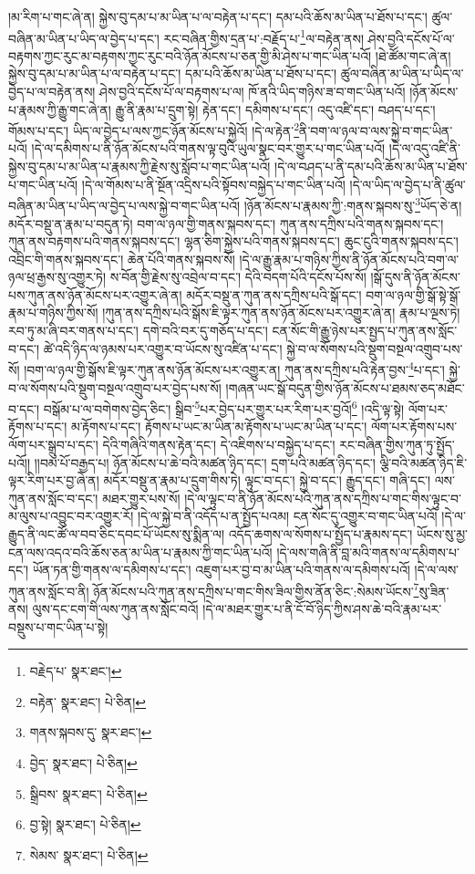 །མ་རིག་པ་གང་ཞེ་ན། སྐྱེས་བུ་དམ་པ་མ་ཡིན་པ་ལ་བརྟེན་པ་དང་། དམ་པའི་ཆོས་མ་ཡིན་པ་ཐོས་པ་དང་། ཚུལ་བཞིན་མ་ཡིན་པ་ཡིད་ལ་བྱེད་པ་དང་། རང་བཞིན་གྱིས་དྲན་པ་:བརྗོད་པ་\footnote{བརྗེད་པ་  སྣར་ཐང་། }ལ་བརྟེན་ནས། ཤེས་བྱའི་དངོས་པོ་ལ་བརྟགས་ཀྱང་རུང་མ་བརྟགས་ཀྱང་རུང་བའི་ཉོན་མོངས་པ་ཅན་གྱི་མི་ཤེས་པ་གང་ཡིན་པའོ། །ཐེ་ཚོམ་གང་ཞེ་ན། སྐྱེས་བུ་དམ་པ་མ་ཡིན་པ་ལ་བརྟེན་པ་དང་། དམ་པའི་ཆོས་མ་ཡིན་པ་ཐོས་པ་དང་། ཚུལ་བཞིན་མ་ཡིན་པ་ཡིད་ལ་བྱེད་པ་ལ་བརྟེན་ནས། ཤེས་བྱའི་དངོས་པོ་ལ་བརྟགས་པ་ལ། ཁོ་ནའི་ཡིད་གཉིས་ཟ་བ་གང་ཡིན་པའོ། །ཉོན་མོངས་པ་རྣམས་ཀྱི་རྒྱུ་གང་ཞེ་ན། རྒྱུ་ནི་རྣམ་པ་དྲུག་སྟེ། རྟེན་དང་། དམིགས་པ་དང་། འདུ་འཛི་དང་། བཤད་པ་དང་། གོམས་པ་དང་། ཡིད་ལ་བྱེད་པ་ལས་ཀྱང་ཉོན་མོངས་པ་སྐྱེའོ། །དེ་ལ་རྟེན་\footnote{བརྟེན་  སྣར་ཐང་།  པེ་ཅིན། }ནི་བག་ལ་ཉལ་བ་ལས་སྐྱེ་བ་གང་ཡིན་པའོ། །དེ་ལ་དམིགས་པ་ནི་ཉོན་མོངས་པའི་གནས་ལྟ་བུའི་ཡུལ་སྣང་བར་གྱུར་པ་གང་ཡིན་པའོ། །དེ་ལ་འདུ་འཛི་ནི་སྐྱེས་བུ་དམ་པ་མ་ཡིན་པ་རྣམས་ཀྱི་རྗེས་སུ་སློབ་པ་གང་ཡིན་པའོ། །དེ་ལ་བཤད་པ་ནི་དམ་པའི་ཆོས་མ་ཡིན་པ་ཐོས་པ་གང་ཡིན་པའོ། །དེ་ལ་གོམས་པ་ནི་སྔོན་འདྲིས་པའི་སྟོབས་བསྐྱེད་པ་གང་ཡིན་པའོ། །དེ་ལ་ཡིད་ལ་བྱེད་པ་ནི་ཚུལ་བཞིན་མ་ཡིན་པ་ཡིད་ལ་བྱེད་པ་ལས་སྐྱེ་བ་གང་ཡིན་པའོ། །ཉོན་མོངས་པ་རྣམས་ཀྱི་:གནས་སྐབས་སུ་\footnote{གནས་སྐབས་དུ་  སྣར་ཐང་། }ཡོད་ཅེ་ན། མདོར་བསྡུ་ན་རྣམ་པ་བདུན་ཏེ། བག་ལ་ཉལ་གྱི་གནས་སྐབས་དང་། ཀུན་ནས་དཀྲིས་པའི་གནས་སྐབས་དང་། ཀུན་ནས་བརྟགས་པའི་གནས་སྐབས་དང་། ལྷན་ཅིག་སྐྱེས་པའི་གནས་སྐབས་དང་། ཆུང་ངུའི་གནས་སྐབས་དང་། འབྲིང་གི་གནས་སྐབས་དང་། ཆེན་པོའི་གནས་སྐབས་སོ། །དེ་ལ་རྒྱུ་རྣམ་པ་གཉིས་ཀྱིས་ནི་ཉོན་མོངས་པའི་བག་ལ་ཉལ་ཕྲ་རྒྱས་སུ་འགྱུར་ཏེ། ས་བོན་གྱི་རྗེས་སུ་འབྲེལ་བ་དང་། དེའི་བདག་པོའི་དངོས་པོས་སོ། །སྒོ་དུས་ནི་ཉོན་མོངས་པས་ཀུན་ནས་ཉོན་མོངས་པར་འགྱུར་ཞེ་ན། མདོར་བསྡུ་ན་ཀུན་ནས་དཀྲིས་པའི་སྒོ་དང་། བག་ལ་ཉལ་གྱི་སྒོ་སྟེ་སྒོ་རྣམ་པ་གཉིས་ཀྱིས་སོ། །ཀུན་ནས་དཀྲིས་པའི་སྒོས་ཇི་ལྟར་ཀུན་ནས་ཉོན་མོངས་པར་འགྱུར་ཞེ་ན། རྣམ་པ་ལྔས་ཏེ། རབ་ཏུ་མ་ཞི་བར་གནས་པ་དང་། དགེ་བའི་བར་དུ་གཅོད་པ་དང་། ངན་སོང་གི་རྒྱུ་ཉེས་པར་སྤྱད་པ་ཀུན་ནས་སློང་བ་དང་། ཚེ་འདི་ཉིད་ལ་ཉམས་པར་འགྱུར་བ་ཡོངས་སུ་འཛིན་པ་དང་། སྐྱེ་བ་ལ་སོགས་པའི་སྡུག་བསྔལ་འགྲུབ་པས་སོ། །བག་ལ་ཉལ་གྱི་སྒོས་ཇི་ལྟར་ཀུན་ནས་ཉོན་མོངས་པར་འགྱུར་ན། ཀུན་ནས་དཀྲིས་པའི་རྟེན་བྱས་\footnote{བྱེད་  སྣར་ཐང་།  པེ་ཅིན། }པ་དང་། སྐྱེ་བ་ལ་སོགས་པའི་སྡུག་བསྔལ་འགྲུབ་པར་བྱེད་པས་སོ། །གཞན་ཡང་སྒོ་བདུན་གྱིས་ཉོན་མོངས་པ་ཐམས་ཅད་མཐོང་བ་དང་། བསྒོམ་པ་ལ་བགེགས་བྱེད་ཅིང་། སྒྲིབ་\footnote{སྒྲིབས་  སྣར་ཐང་།  པེ་ཅིན། }པར་བྱེད་པར་གྱུར་པར་རིག་པར་བྱའོ།\footnote{བྱ་སྟེ།  སྣར་ཐང་།  པེ་ཅིན། } །འདི་ལྟ་སྟེ། ལོག་པར་རྟོགས་པ་དང་། མ་རྟོགས་པ་དང་། རྟོགས་པ་ཡང་མ་ཡིན་མ་རྟོགས་པ་ཡང་མ་ཡིན་པ་དང་། ལོག་པར་རྟོགས་པས་ལོག་པར་སྒྲུབ་པ་དང་། དེའི་གཞིའི་གནས་རྟེན་དང་། དེ་འཇིགས་པ་བསྐྱེད་པ་དང་། རང་བཞིན་གྱིས་ཀུན་ཏུ་སྤྱོད་པའོ།། །།བམ་པོ་བརྒྱད་པ། ཉོན་མོངས་པ་ཆེ་བའི་མཚན་ཉིད་དང་། དྲག་པའི་མཚན་ཉིད་དང་། ལྕི་བའི་མཚན་ཉིད་ཇི་ལྟར་རིག་པར་བྱ་ཞེ་ན། མདོར་བསྡུ་ན་རྣམ་པ་དྲུག་གིས་ཏེ། ལྟུང་བ་དང་། སྐྱེ་བ་དང་། རྒྱུད་དང་། གཞི་དང་། ལས་ཀུན་ནས་སློང་བ་དང་། མཐར་གྱུར་པས་སོ། །དེ་ལ་ལྟུང་བ་ནི་ཉོན་མོངས་པའི་ཀུན་ནས་དཀྲིས་པ་གང་གིས་ལྟུང་བ་མ་ལུས་པ་འབྱུང་བར་འགྱུར་རོ། །དེ་ལ་སྐྱེ་བ་ནི་འདོད་པ་ན་སྤྱོད་པའམ། ངན་སོང་དུ་འགྱུར་བ་གང་ཡིན་པའོ། །དེ་ལ་རྒྱུད་ནི་ལང་ཚོ་ལ་བབ་ཅིང་དབང་པོ་ཡོངས་སུ་སྨིན་ལ། འདོད་ཆགས་ལ་སོགས་པ་སྤྱོད་པ་རྣམས་དང་། ཡོངས་སུ་མྱ་ངན་ལས་འདའ་བའི་ཆོས་ཅན་མ་ཡིན་པ་རྣམས་ཀྱི་གང་ཡིན་པའོ། །དེ་ལས་གཞི་ནི་བླ་མའི་གནས་ལ་དམིགས་པ་དང་། ཡོན་ཏན་གྱི་གནས་ལ་དམིགས་པ་དང་། འཇུག་པར་བྱ་བ་མ་ཡིན་པའི་གནས་ལ་དམིགས་པའོ། །དེ་ལ་ལས་ཀུན་ནས་སློང་བ་ནི། ཉོན་མོངས་པའི་ཀུན་ནས་དཀྲིས་པ་གང་གིས་ཟིལ་གྱིས་ནོན་ཅིང་:སེམས་ཡོངས་\footnote{སེམས་  སྣར་ཐང་།  པེ་ཅིན། }སུ་ཟིན་ནས། ལུས་དང་ངག་གི་ལས་ཀུན་ནས་སློང་བའོ། །དེ་ལ་མཐར་གྱུར་པ་ནི་ངོ་བོ་ཉིད་ཀྱིས་ཤས་ཆེ་བའི་རྣམ་པར་བསྡུས་པ་གང་ཡིན་པ་སྟེ། 